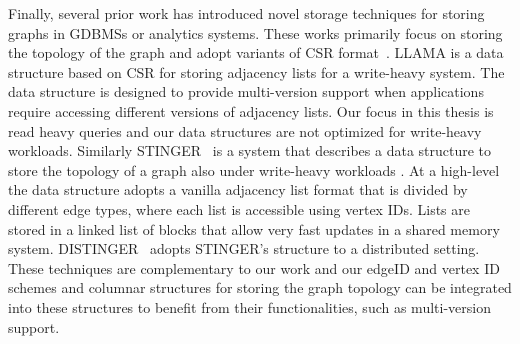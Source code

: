 Finally, several prior work has introduced novel storage techniques for storing graphs in GDBMSs or analytics systems. These works primarily focus on storing the topology of the graph and adopt variants of CSR format~\cite{yale}. LLAMA is a data structure based on CSR for storing adjacency lists for a write-heavy system. The data structure is designed to provide multi-version support when applications require accessing different versions of adjacency lists. Our focus in this thesis is read heavy queries and our data structures are not optimized for write-heavy workloads. Similarly STINGER~\cite{stinger} is a system that describes a data structure to store the topology of a graph also under write-heavy workloads . At a high-level the data structure adopts a vanilla adjacency list format that is divided by different edge types, where each list  is accessible using vertex IDs. Lists are stored in a linked list of blocks that allow very fast updates in a shared memory system. DISTINGER~\cite{distinger} adopts STINGER's structure to a distributed setting. These techniques are complementary to our work and our edgeID and vertex ID schemes and columnar structures for storing the graph topology can be integrated into these structures to benefit from their functionalities, such as multi-version support. 






